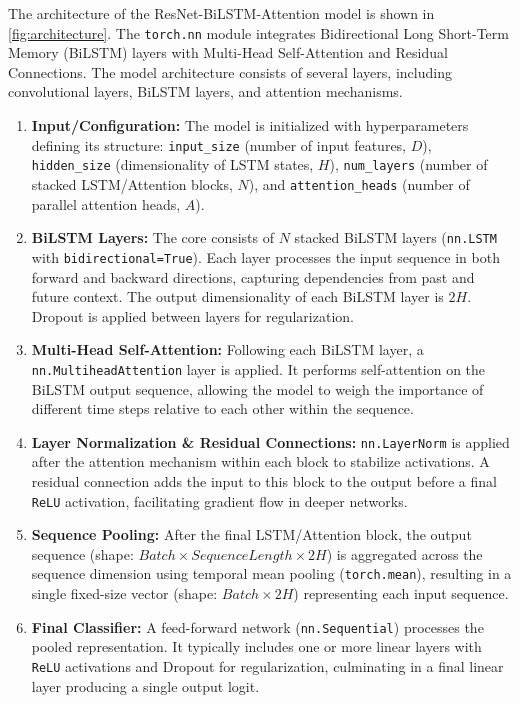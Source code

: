 The architecture of the ResNet-BiLSTM-Attention model is shown in \autoref{fig:architecture}. The \texttt{torch.nn} module integrates Bidirectional Long Short-Term Memory (BiLSTM) layers with Multi-Head Self-Attention and Residual Connections. The model architecture consists of several layers, including convolutional layers, BiLSTM layers, and attention mechanisms.

\begin{enumerate}
  \item \textbf{Input/Configuration:} The model is initialized with hyperparameters defining its structure: \texttt{input\_size} (number of input features, $D$), \texttt{hidden\_size} (dimensionality of LSTM states, $H$), \texttt{num\_layers} (number of stacked LSTM/Attention blocks, $N$), and \texttt{attention\_heads} (number of parallel attention heads, $A$).

  \item \textbf{BiLSTM Layers:} The core consists of $N$ stacked BiLSTM layers (\texttt{nn.LSTM} with \texttt{bidirectional=True}). Each layer processes the input sequence in both forward and backward directions, capturing dependencies from past and future context. The output dimensionality of each BiLSTM layer is $2H$. Dropout is applied between layers for regularization.

  \item \textbf{Multi-Head Self-Attention:} Following each BiLSTM layer, a \texttt{nn.MultiheadAttention} layer is applied. It performs self-attention on the BiLSTM output sequence, allowing the model to weigh the importance of different time steps relative to each other within the sequence.

  \item \textbf{Layer Normalization \& Residual Connections:} \texttt{nn.LayerNorm} is applied after the attention mechanism within each block to stabilize activations. A residual connection adds the input to this block to the output before a final \texttt{ReLU} activation, facilitating gradient flow in deeper networks.

  \item \textbf{Sequence Pooling:} After the final LSTM/Attention block, the output sequence (shape: $Batch \times Sequence Length \times 2H$) is aggregated across the sequence dimension using temporal mean pooling (\texttt{torch.mean}), resulting in a single fixed-size vector (shape: $Batch \times 2H$) representing each input sequence.

  \item \textbf{Final Classifier:} A feed-forward network (\texttt{nn.Sequential}) processes the pooled representation. It typically includes one or more linear layers with \texttt{ReLU} activations and Dropout for regularization, culminating in a final linear layer producing a single output logit.


\end{enumerate}
